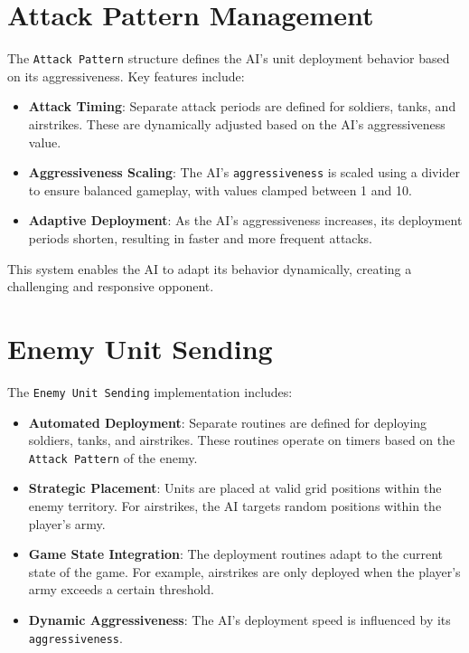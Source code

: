\section{Attack Pattern Management}
The \texttt{Attack Pattern} structure defines the AI's unit deployment behavior based on its aggressiveness. Key features include:
\begin{itemize}
    \item \textbf{Attack Timing}: Separate attack periods are defined for soldiers, tanks, and airstrikes. These are dynamically adjusted based on the AI's aggressiveness value.
    \item \textbf{Aggressiveness Scaling}: The AI's \texttt{aggressiveness} is scaled using a divider to ensure balanced gameplay, with values clamped between 1 and 10.
    \item \textbf{Adaptive Deployment}: As the AI's aggressiveness increases, its deployment periods shorten, resulting in faster and more frequent attacks.
\end{itemize}
This system enables the AI to adapt its behavior dynamically, creating a challenging and responsive opponent.

\section{Enemy Unit Sending}
The \texttt{Enemy Unit Sending} implementation includes:
\begin{itemize}
    \item \textbf{Automated Deployment}: Separate routines are defined for deploying soldiers, tanks, and airstrikes. These routines operate on timers based on the \texttt{Attack Pattern} of the enemy.
    \item \textbf{Strategic Placement}: Units are placed at valid grid positions within the enemy territory. For airstrikes, the AI targets random positions within the player's army.
    \item \textbf{Game State Integration}: The deployment routines adapt to the current state of the game. For example, airstrikes are only deployed when the player's army exceeds a certain threshold.
    \item \textbf{Dynamic Aggressiveness}: The AI's deployment speed is influenced by its \texttt{aggressiveness}.
\end{itemize}

